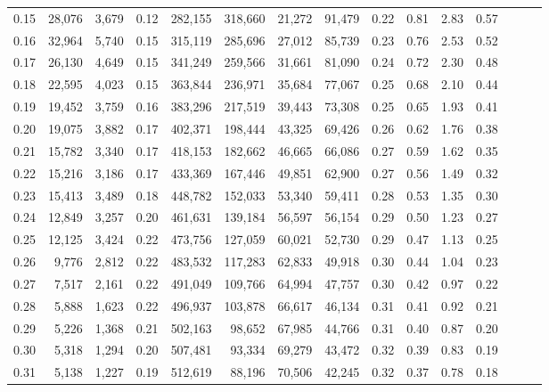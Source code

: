 \begin{tabular}{rrrrrrrrrrrrrrr}
0.15 &  28,076 &  3,679 &  0.12 &  282,155 &  318,660 &   21,272 &   91,479 &  0.22 &  0.81 &  2.83 &      0.57 \\
0.16 &  32,964 &  5,740 &  0.15 &  315,119 &  285,696 &   27,012 &   85,739 &  0.23 &  0.76 &  2.53 &      0.52 \\
0.17 &  26,130 &  4,649 &  0.15 &  341,249 &  259,566 &   31,661 &   81,090 &  0.24 &  0.72 &  2.30 &      0.48 \\
0.18 &  22,595 &  4,023 &  0.15 &  363,844 &  236,971 &   35,684 &   77,067 &  0.25 &  0.68 &  2.10 &      0.44 \\
0.19 &  19,452 &  3,759 &  0.16 &  383,296 &  217,519 &   39,443 &   73,308 &  0.25 &  0.65 &  1.93 &      0.41 \\
0.20 &  19,075 &  3,882 &  0.17 &  402,371 &  198,444 &   43,325 &   69,426 &  0.26 &  0.62 &  1.76 &      0.38 \\
0.21 &  15,782 &  3,340 &  0.17 &  418,153 &  182,662 &   46,665 &   66,086 &  0.27 &  0.59 &  1.62 &      0.35 \\
0.22 &  15,216 &  3,186 &  0.17 &  433,369 &  167,446 &   49,851 &   62,900 &  0.27 &  0.56 &  1.49 &      0.32 \\
0.23 &  15,413 &  3,489 &  0.18 &  448,782 &  152,033 &   53,340 &   59,411 &  0.28 &  0.53 &  1.35 &      0.30 \\
0.24 &  12,849 &  3,257 &  0.20 &  461,631 &  139,184 &   56,597 &   56,154 &  0.29 &  0.50 &  1.23 &      0.27 \\
0.25 &  12,125 &  3,424 &  0.22 &  473,756 &  127,059 &   60,021 &   52,730 &  0.29 &  0.47 &  1.13 &      0.25 \\
0.26 &   9,776 &  2,812 &  0.22 &  483,532 &  117,283 &   62,833 &   49,918 &  0.30 &  0.44 &  1.04 &      0.23 \\
0.27 &   7,517 &  2,161 &  0.22 &  491,049 &  109,766 &   64,994 &   47,757 &  0.30 &  0.42 &  0.97 &      0.22 \\
0.28 &   5,888 &  1,623 &  0.22 &  496,937 &  103,878 &   66,617 &   46,134 &  0.31 &  0.41 &  0.92 &      0.21 \\
0.29 &   5,226 &  1,368 &  0.21 &  502,163 &   98,652 &   67,985 &   44,766 &  0.31 &  0.40 &  0.87 &      0.20 \\
0.30 &   5,318 &  1,294 &  0.20 &  507,481 &   93,334 &   69,279 &   43,472 &  0.32 &  0.39 &  0.83 &      0.19 \\
0.31 &   5,138 &  1,227 &  0.19 &  512,619 &   88,196 &   70,506 &   42,245 &  0.32 &  0.37 &  0.78 &      0.18 \\

\end{tabular}

